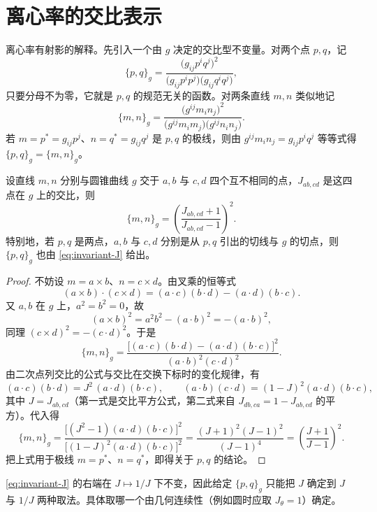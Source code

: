 \section{离心率的交比表示}

离心率有射影的解释。先引入一个由 $g$ 决定的交比型不变量。对两个点 $p,q$，记
\begin{equation}
\{p,q\}_g
=\frac{\bigl(g_{ij}p^iq^j\bigr)^2}
{\bigl(g_{ij}p^ip^j\bigr)\bigl(g_{ij}q^iq^j\bigr)},
\label{eq:invariant-point}
\end{equation}
只要分母不为零，它就是 $p,q$ 的规范无关的函数。对两条直线 $m,n$ 类似地记
\[
\{m,n\}_g
=\frac{\bigl(g^{ij}m_in_j\bigr)^2}
{\bigl(g^{ij}m_im_j\bigr)\bigl(g^{ij}n_in_j\bigr)} .
\]
若 $m=p^*=g_{ij}p^j$、$n=q^*=g_{ij}q^j$ 是 $p,q$ 的极线，则由 $g^{ij}m_in_j=g_{ij}p^iq^j$
等等式得 $\{p,q\}_g=\{m,n\}_g$。

\begin{lemma}\label{lem:invariant-J}
设直线 $m,n$ 分别与圆锥曲线 $g$ 交于 $a,b$ 与 $c,d$ 四个互不相同的点，$J_{ab,cd}$ 是这四点在
$g$ 上的交比，则
\begin{equation}
\{m,n\}_g=\left(\frac{J_{ab,cd}+1}{J_{ab,cd}-1}\right)^2 .
\label{eq:invariant-J}
\end{equation}
特别地，若 $p,q$ 是两点，$a,b$ 与 $c,d$ 分别是从 $p,q$ 引出的切线与 $g$ 的切点，则
$\{p,q\}_g$ 也由 \eqref{eq:invariant-J} 给出。
\end{lemma}

\begin{proof}
不妨设 $m=a\times b$、$n=c\times d$。由叉乘的恒等式
\[
(a\times b)\cdot(c\times d)=(a\cdot c)(b\cdot d)-(a\cdot d)(b\cdot c).
\]
又 $a,b$ 在 $g$ 上，$a^2=b^2=0$，故
\[
(a\times b)^2=a^2b^2-(a\cdot b)^2=-(a\cdot b)^2,
\]
同理 $(c\times d)^2=-(c\cdot d)^2$。于是
\[
\{m,n\}_g
=\frac{\bigl[(a\cdot c)(b\cdot d)-(a\cdot d)(b\cdot c)\bigr]^2}{(a\cdot b)^2(c\cdot d)^2}.
\]
由二次点列交比的公式与交比在交换下标时的变化规律，有
\[
(a\cdot c)(b\cdot d)=J^2\,(a\cdot d)(b\cdot c),\qquad
(a\cdot b)(c\cdot d)=(1-J)^2(a\cdot d)(b\cdot c),
\]
其中 $J=J_{ab,cd}$（第一式是交比平方公式，第二式来自 $J_{db,ca}=1-J_{ab,cd}$ 的平方）。代入得
\[
\{m,n\}_g
=\frac{\bigl[(J^2-1)(a\cdot d)(b\cdot c)\bigr]^2}
{\bigl[(1-J)^2(a\cdot d)(b\cdot c)\bigr]^2}
=\frac{(J+1)^2(J-1)^2}{(J-1)^4}
=\left(\frac{J+1}{J-1}\right)^2 .
\]
把上式用于极线 $m=p^*$、$n=q^*$，即得关于 $p,q$ 的结论。
\end{proof}

\begin{remark}
\eqref{eq:invariant-J} 的右端在 $J\mapsto1/J$ 下不变，因此给定 $\{p,q\}_g$ 只能把 $J$ 确定到
$J$ 与 $1/J$ 两种取法。具体取哪一个由几何连续性（例如圆时应取 $J_\theta=1$）确定。
\end{remark}

